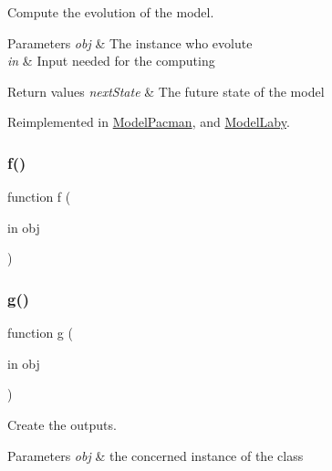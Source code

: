 Compute the evolution of the model. 


\begin{DoxyParams}{Parameters}
{\em obj} & The instance who evolute \\
\hline
{\em in} & Input needed for the computing \\
\hline
\end{DoxyParams}

\begin{DoxyRetVals}{Return values}
{\em next\+State} & The future state of the model \\
\hline
\end{DoxyRetVals}


Reimplemented in \hyperlink{class_model_pacman_a6f3b146c92a207e95690d08975e1e072}{Model\+Pacman}, and \hyperlink{class_model_laby_a6f3b146c92a207e95690d08975e1e072}{Model\+Laby}.

\mbox{\label{class_model_walls_af07620c51528eb1e504befcf52ca0cee}} 
\subsubsection{\texorpdfstring{f()}{f()}\hspace{0.1cm}{\footnotesize\ttfamily [2/2]}}
{\footnotesize\ttfamily function f (\begin{DoxyParamCaption}\item[{in}]{obj }\end{DoxyParamCaption})}

\mbox{\label{class_model_walls_a07dadfabe92bf9a144b8a862720e7746}} 
\subsubsection{\texorpdfstring{g()}{g()}}
{\footnotesize\ttfamily function g (\begin{DoxyParamCaption}\item[{in}]{obj }\end{DoxyParamCaption})\hspace{0.3cm}{\ttfamily [virtual]}}



Create the outputs. 


\begin{DoxyParams}{Parameters}
{\em obj} & the concerned instance of the class \\
\hline
\end{DoxyParams}

